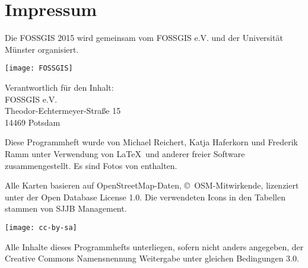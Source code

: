 \newpage
\section*{Impressum}
\label{impressum}
\vspace{-0.5em}


\begin{raggedright}
Die FOSSGIS 2015 wird gemeinsam vom FOSSGIS e.V. und der Universität Münster 
organisiert.

\vspace{0.5em}
	\texttt{[image: FOSSGIS]}

\vspace{0.5em}
\noindent Verantwortlich für den Inhalt:\\
FOSSGIS e.V.\\
Theodor-Echtermeyer-Straße 15\\
14469 Potsdam

\vspace{1em}
\noindent Diese Programmheft wurde von Michael Reichert, Katja Haferkorn und 
Frederik Ramm unter Verwendung von \LaTeX\ und anderer freier Software zusammengestellt. Es sind Fotos von %
enthalten.

\vspace{0.5em}

\noindent Alle Karten basieren auf Open\-Street\-Map-Daten, 
\mbox{\copyright\ OSM}-Mitwirkende, lizenziert unter der Open Database License 1.0.
Die verwendeten Icons in den Tabellen stammen von SJJB Management.


\vspace{1em}
\noindent \begin{minipage}[htbp]{0.2\textwidth}
\noindent\texttt{[image: cc-by-sa]}
\end{minipage}
\hfill
\begin{minipage}[hbtp]{0.74\textwidth}
Alle Inhalte dieses Programmhefts unterliegen, sofern nicht anders angegeben, 
der Creative Commons Namensnennung Weitergabe unter gleichen Bedingungen 3.0.
\end{minipage}
\end{raggedright}

